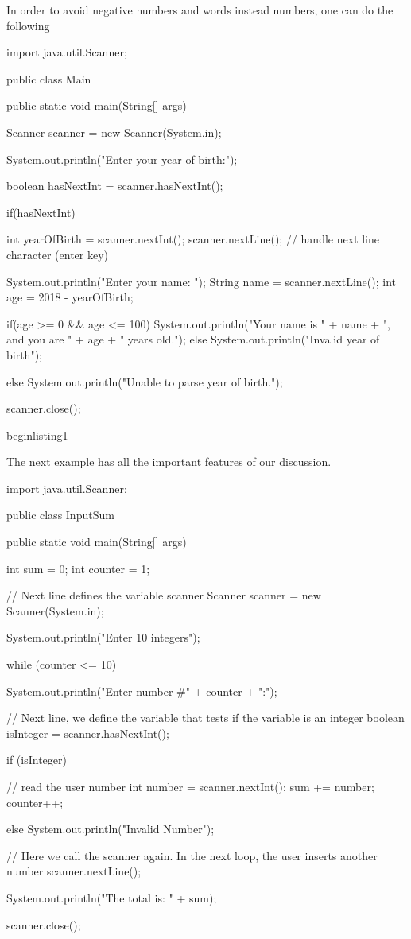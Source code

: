 In order to avoid negative numbers and words instead numbers, one can do the following
\begin{listing}{1}
import java.util.Scanner;

public class Main {

    public static void main(String[] args) {
        Scanner scanner = new Scanner(System.in);

        System.out.println("Enter your year of birth:");

        boolean hasNextInt = scanner.hasNextInt();

        if(hasNextInt) {
            int yearOfBirth = scanner.nextInt();
            scanner.nextLine(); // handle next line character (enter key)

            System.out.println("Enter your name: ");
            String name = scanner.nextLine();
            int age = 2018 - yearOfBirth;

            if(age >= 0 && age <= 100) {
                System.out.println("Your name is " + name + ", and you are " + age + " years old.");
            } else {
                System.out.println("Invalid year of birth");
            }
        } else {
            System.out.println("Unable to parse year of birth.");
        }

        scanner.close();
    }
}begin{listing}{1}
\end{listing}

The next example has all the important features of our discussion.
\begin{listing}{1}
import java.util.Scanner;

public class InputSum {
   public static void main(String[] args) {
      
      int sum = 0;
      int counter = 1;

      // Next line defines the variable scanner
      Scanner scanner = new Scanner(System.in);

      System.out.println("Enter 10 integers");

      while (counter <= 10) {
      
      System.out.println("Enter number #" + counter + ":");

      // Next line, we define the variable that tests if the variable is an integer
      boolean isInteger = scanner.hasNextInt();

      if (isInteger) {

         // read the user number 
         int number = scanner.nextInt();
         sum += number;
         counter++;
         } else {
            System.out.println("Invalid Number");
         }

      // Here we call the scanner again. In the next loop, the user inserts another number
      scanner.nextLine();
      }

      System.out.println("The total is: " + sum);

      scanner.close();

   }
}
\end{listing}
